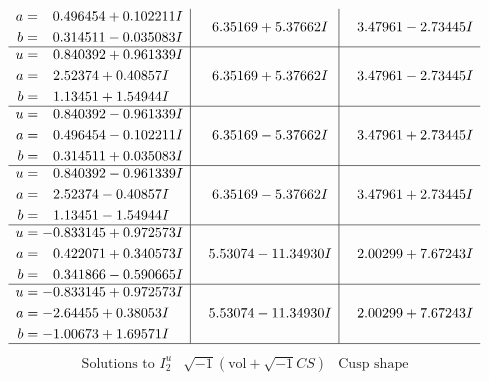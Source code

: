 \documentclass[1p]{elsarticle_modified}
\theoremstyle{definition}
\newcommand{\I}{\sqrt{-1}}
\begin{document}
$$\begin{array}{c|c|c}
\begin{aligned}
a &= \phantom{-}0.496454 + 0.102211 I \\
b &= \phantom{-}0.314511 - 0.035083 I\end{aligned}
 & \phantom{-}6.35169 + 5.37662 I & \phantom{-}3.47961 - 2.73445 I \\ \hline\begin{aligned}
u &= \phantom{-}0.840392 + 0.961339 I \\
a &= \phantom{-}2.52374 + 0.40857 I \\
b &= \phantom{-}1.13451 + 1.54944 I\end{aligned}
 & \phantom{-}6.35169 + 5.37662 I & \phantom{-}3.47961 - 2.73445 I \\ \hline\begin{aligned}
u &= \phantom{-}0.840392 - 0.961339 I \\
a &= \phantom{-}0.496454 - 0.102211 I \\
b &= \phantom{-}0.314511 + 0.035083 I\end{aligned}
 & \phantom{-}6.35169 - 5.37662 I & \phantom{-}3.47961 + 2.73445 I \\ \hline\begin{aligned}
u &= \phantom{-}0.840392 - 0.961339 I \\
a &= \phantom{-}2.52374 - 0.40857 I \\
b &= \phantom{-}1.13451 - 1.54944 I\end{aligned}
 & \phantom{-}6.35169 - 5.37662 I & \phantom{-}3.47961 + 2.73445 I \\ \hline\begin{aligned}
u &= -0.833145 + 0.972573 I \\
a &= \phantom{-}0.422071 + 0.340573 I \\
b &= \phantom{-}0.341866 - 0.590665 I\end{aligned}
 & \phantom{-}5.53074 - 11.34930 I & \phantom{-}2.00299 + 7.67243 I \\ \hline\begin{aligned}
u &= -0.833145 + 0.972573 I \\
a &= -2.64455 + 0.38053 I \\
b &= -1.00673 + 1.69571 I\end{aligned}
 & \phantom{-}5.53074 - 11.34930 I & \phantom{-}2.00299 + 7.67243 I\\
 \hline 
 \end{array}$$\newpage$$\begin{array}{c|c|c}  
\text{Solutions to }I^u_{2}& \I (\text{vol} + \sqrt{-1}CS) & \text{Cusp shape}\\

\end{array}$$
\end{document}
